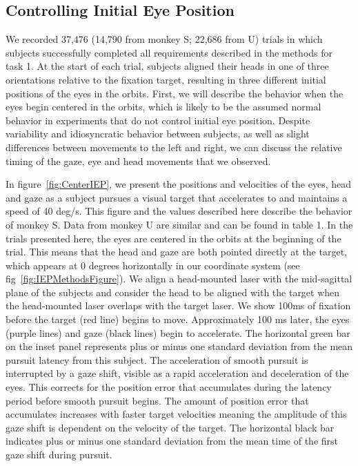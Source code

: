\documentclass[12pt]{article}
\begin{document}
\subsection{Controlling Initial Eye Position}
We recorded 37,476 (14,790 from monkey S; 22,686 from U) trials in which subjects successfully completed all requirements described in the methods for task 1. At the start of each trial, subjects aligned their heads in one of three orientations relative to the fixation target, resulting in three different initial positions of the eyes in the orbits. First, we will describe the behavior when the eyes begin centered in the orbits, which is likely to be the assumed normal behavior in experiments that do not control initial eye position. Despite variability and idiosyncratic behavior between subjects, as well as slight differences between movements to the left and right, we can discuss the relative timing of the gaze, eye and head movements that we observed.

In figure~\ref{fig:CenterIEP}, we present the positions and velocities of the eyes, head and gaze as a subject pursues a visual target that accelerates to and maintains a speed of 40 deg/s. This figure and the values described here describe the behavior of monkey S. Data from monkey U are similar and can be found in table 1. In the trials presented here, the eyes are centered in the orbits at the beginning of the trial. This means that the head and gaze are both pointed directly at the target, which appears at 0 degrees horizontally in our coordinate system (see fig~\ref{fig:IEPMethodsFigure}). We align a head-mounted laser with the mid-sagittal plane of the subjects and consider the head to be aligned with the target when the head-mounted laser overlaps with the target laser. We show 100ms of fixation before the target (red line) begins to move. Approximately 100 ms later, the eyes (purple lines) and gaze (black lines) begin to accelerate. The horizontal green bar on the inset panel represents plus or minus one standard deviation from the mean pursuit latency from this subject. The acceleration of smooth pursuit is interrupted by a gaze shift, visible as a rapid acceleration and deceleration of the eyes. This corrects for the position error that accumulates during the latency period before smooth pursuit begins. The amount of position error that accumulates increases with faster target velocities meaning the amplitude of this gaze shift is dependent on the velocity of the target. The horizontal black bar indicates plus or minus one standard deviation from the mean time of the first gaze shift during pursuit. 
\end{document}
